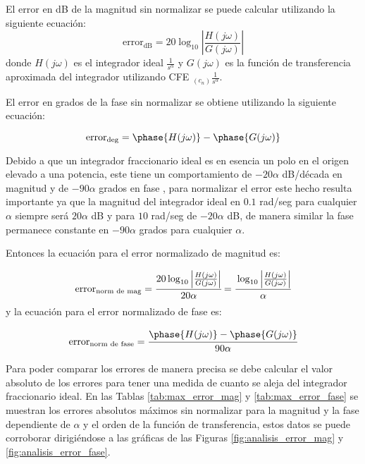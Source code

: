 	El error en dB de la magnitud sin normalizar se puede calcular utilizando la siguiente ecuación:
	\begin{equation}
	\mathrm{error}_{\mathrm{dB}} = 20\log_{10} \left| \frac{H(j\omega)}{G(j\omega)} \right|
	\label{ec:error_sin_norm}
	\end{equation}
	donde $H(j\omega)$ es el integrador ideal $\frac{1}{s^{\alpha}}$ y $G(j\omega)$ es la función de transferencia aproximada del integrador utilizando CFE $ _{(c_{n})} \frac{1}{s^{\alpha}}$. 
	
	El error en grados de la fase sin normalizar se obtiene utilizando la siguiente ecuación:
	
	\begin{equation}
	\mathrm{error}_{\mathrm{deg}} = \phase{H(j\omega)} - \phase{G(j\omega)}
	\end{equation}
	
	Debido a que un integrador fraccionario ideal es en esencia un polo en el origen elevado a una potencia, este tiene un comportamiento de $-20 \alpha$ dB/década en magnitud y de $-90\alpha$ grados en fase \cite{CharlesAlexander2016}, para normalizar el error este hecho resulta importante ya que la magnitud del integrador ideal en $0.1$ rad/seg para cualquier $\alpha$ siempre será $20 \alpha$ dB y para $10$ rad/seg de $-20 \alpha$ dB, de manera similar la fase permanece constante en $-90\alpha$ grados para cualquier $\alpha$.
	
	Entonces la ecuación para el error normalizado de magnitud es:
	
	\begin{equation}
	\mathrm{error}_{\mathrm{norm\,\,de\,\,mag}} = \cfrac{ 20\log_{10} \left| \frac{H(j\omega)}{G(j\omega)} \right| }{20 \alpha} = \cfrac{ \log_{10} \left| \frac{H(j\omega)}{G(j\omega)} \right| }{ \alpha}
	\end{equation}
	y la ecuación para el error normalizado de fase es:
	
	\begin{equation}
	\mathrm{error}_{\mathrm{norm\,\,de\,\,fase}} = \cfrac{\phase{H(j\omega)} - \phase{G(j\omega)}}{90\alpha}
	\end{equation}
	
	Para poder comparar los errores de manera precisa se debe calcular el valor absoluto de los errores para tener una medida de cuanto se aleja del integrador fraccionario ideal. En las Tablas \ref{tab:max_error_mag} y \ref{tab:max_error_fase} se muestran los errores absolutos máximos sin normalizar para la magnitud y la fase dependiente de $\alpha$ y el orden de la función de transferencia, estos datos se puede corroborar dirigiéndose a las gráficas de las Figuras \ref{fig:analisis_error_mag} y \ref{fig:analisis_error_fase}.
	
